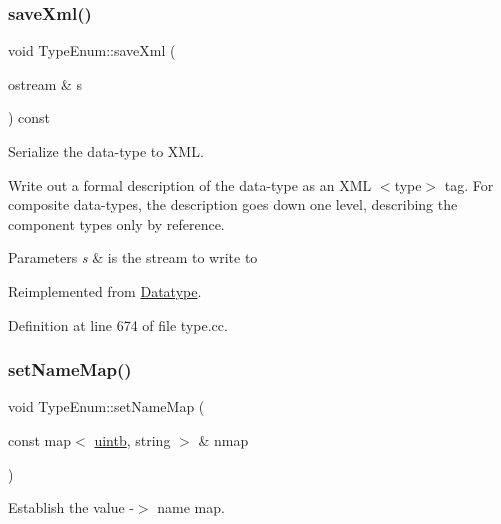 \mbox{\label{class_type_enum_a2ad6a825a5a0a83687814c79ec71ebc4}} 
\subsubsection{\texorpdfstring{saveXml()}{saveXml()}}
{\footnotesize\ttfamily void Type\+Enum\+::save\+Xml (\begin{DoxyParamCaption}\item[{ostream \&}]{s }\end{DoxyParamCaption}) const\hspace{0.3cm}{\ttfamily [virtual]}}



Serialize the data-\/type to X\+ML. 

Write out a formal description of the data-\/type as an X\+ML $<$type$>$ tag. For composite data-\/types, the description goes down one level, describing the component types only by reference. 
\begin{DoxyParams}{Parameters}
{\em s} & is the stream to write to \\
\hline
\end{DoxyParams}


Reimplemented from \mbox{\hyperlink{class_datatype_a33339824f1c50d4354952296070c3902}{Datatype}}.



Definition at line 674 of file type.\+cc.

\mbox{\label{class_type_enum_a888839555ff7b768f371e794a979a8dc}} 
\subsubsection{\texorpdfstring{setNameMap()}{setNameMap()}}
{\footnotesize\ttfamily void Type\+Enum\+::set\+Name\+Map (\begin{DoxyParamCaption}\item[{const map$<$ \mbox{\hyperlink{types_8h_a2db313c5d32a12b01d26ac9b3bca178f}{uintb}}, string $>$ \&}]{nmap }\end{DoxyParamCaption})\hspace{0.3cm}{\ttfamily [protected]}}



Establish the value -\/$>$ name map. 

